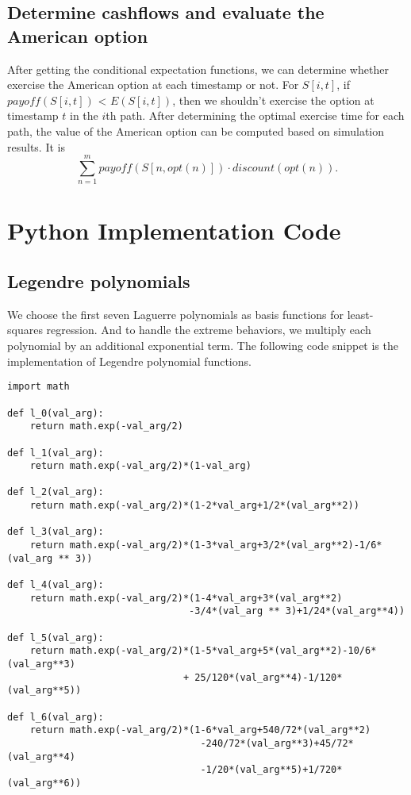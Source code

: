\documentclass[11pt, oneside]{article}   	%
\begin{document}
\subsection{Determine cashflows and evaluate the American option}
After getting the conditional expectation functions, we can determine whether exercise the American option at each timestamp or not. For $S[i, t]$, if $payoff(S[i, t])$ < $E(S[i,t])$, then we shouldn't exercise the option at timestamp $t$ in the $i$th path. After determining the optimal exercise time for each path, the value of the American option can be computed based on simulation results. It is \[  \sum_{n=1}^{m} payoff(S[n, opt(n)]) \cdot discount(opt(n)).\]


\section{Python Implementation Code}
\subsection{Legendre polynomials}
We choose the first seven Laguerre polynomials as basis functions for least-squares regression. And to handle the extreme behaviors, we multiply each polynomial by an additional exponential term. The following code snippet is the implementation of Legendre polynomial functions.
\lstset{language=Python}
\lstset{frame=lines}
\lstset{basicstyle=\footnotesize}
\begin{lstlisting}
import math

def l_0(val_arg):
    return math.exp(-val_arg/2)

def l_1(val_arg):
    return math.exp(-val_arg/2)*(1-val_arg)

def l_2(val_arg):
    return math.exp(-val_arg/2)*(1-2*val_arg+1/2*(val_arg**2))

def l_3(val_arg):
    return math.exp(-val_arg/2)*(1-3*val_arg+3/2*(val_arg**2)-1/6*(val_arg ** 3))

def l_4(val_arg):
    return math.exp(-val_arg/2)*(1-4*val_arg+3*(val_arg**2)
                                -3/4*(val_arg ** 3)+1/24*(val_arg**4))

def l_5(val_arg):
    return math.exp(-val_arg/2)*(1-5*val_arg+5*(val_arg**2)-10/6*(val_arg**3)
                               + 25/120*(val_arg**4)-1/120*(val_arg**5))

def l_6(val_arg):
    return math.exp(-val_arg/2)*(1-6*val_arg+540/72*(val_arg**2)
                                  -240/72*(val_arg**3)+45/72*(val_arg**4)
                                  -1/20*(val_arg**5)+1/720*(val_arg**6))
\end{lstlisting}
\end{document}
